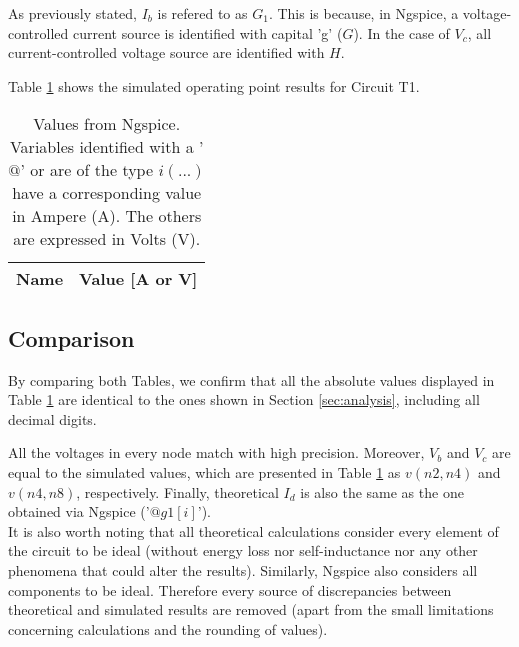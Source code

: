 As previously stated, $I_b$ is refered to as $G_1$. This is because, in Ngspice, a
voltage-controlled current source is identified with capital 'g' ($G$). In the case of
$V_c$, all current-controlled voltage source are identified with $H$.

Table \ref{tab:op} shows the simulated operating point results for Circuit T1.



\begin{table}[h]
	\centering
	\begin{tabular}{|l|r|}
		\hline    
		{\bf Name} & {\bf Value [A or V]} \\ \hline
    		
	\end{tabular}
	
	\caption{Values from Ngspice. Variables identified with a '$@$' or are of the type
	$i(...)$ have a corresponding value in Ampere (A). The others are expressed in Volts (V).}
    
\label{tab:op}
\end{table}




\subsection{Comparison}



By comparing both Tables, we confirm that all the absolute values displayed in Table \ref{tab:op}
are identical to the ones shown in Section \ref{sec:analysis}, including all decimal digits.

All the voltages in every node match with high precision. Moreover, $V_b$ and $V_c$ are
equal to the simulated values, which are presented in Table \ref{tab:op} as $v(n2,n4)$ and
$v(n4,n8)$, respectively. Finally, theoretical $I_d$ is also the same as the one obtained
via Ngspice ('$@g1[i]$'). \\

It is also worth noting that all theoretical calculations consider every element of the
circuit to be ideal (without energy loss nor self-inductance nor any other phenomena that could
alter the results). Similarly, Ngspice also considers all components to be ideal. Therefore
every source of discrepancies between theoretical and simulated results are removed (apart from
the small limitations concerning calculations and the rounding of values).

